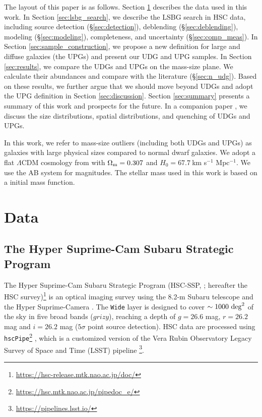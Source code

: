 \documentclass[twocolumn,astrosymb,twocolappendix,linenumbers]{aastex631}
\newcommand{\code}[1]{\texttt{#1}}
\begin{document}
\begin{CJK*}{UTF8}{gbsn}
The layout of this paper is as follows. Section \ref{sec:data} describes the data used in this work. In Section \ref{sec:lsbg_search}, we describe the LSBG search in HSC data, including source detection (\S \ref{sec:detection}), deblending (\S \ref{sec:deblending}), modeling (\S \ref{sec:modeling}), completeness, and uncertainty (\S\ref{sec:comp_meas}). In Section \ref{sec:sample_construction}, we propose a new definition for large and diffuse galaxies (the UPGs) and present our UDG and UPG samples. In Section \ref{sec:results}, we compare the UDGs and UPGs on the mass-size plane. We calculate their abundances and compare with the literature (\S \ref{sec:n_udg}). Based on these results, we further argue that we should move beyond UDGs and adopt the UPG definition in Section \ref{sec:discussion}. Section \ref{sec:summary} presents a summary of this work and prospects for the future. In a companion paper \citep{Li2023}, we discuss the size distributions, spatial distributions, and quenching of UDGs and UPGs. 

In this work, we refer to mass-size outliers (including both UDGs and UPGs) as galaxies with large physical sizes compared to normal dwarf galaxies. We adopt a flat $\Lambda$CDM cosmology from \citet{Planck15} with $\Omega_{\rm m}= 0.307$ and $H_0 = 67.7\ $km s$^{-1}$ Mpc$^{-1}$. We use the AB system \citep{Oke1983} for magnitudes. The stellar mass used in this work is based on a \citet{Chabrier2003} initial mass function.


\section{Data} \label{sec:data}
\subsection{The Hyper Suprime-Cam Subaru Strategic Program}
The Hyper Suprime-Cam Subaru Strategic Program (HSC-SSP, \citealt{Aihara2018}; hereafter the HSC survey)\footnote{\url{https://hsc-release.mtk.nao.ac.jp/doc/}} is an optical imaging survey using the 8.2-m Subaru telescope and the Hyper Suprime-Camera \citep{Miyazaki2012, Miyazaki2018}. The \texttt{Wide} layer is designed to cover $\sim 1000\ \rm{deg}^{2}$ of the sky in five broad bands ($grizy$), reaching a depth of $g=26.6$ mag, $r=26.2$ mag and $i=26.2$ mag ($5\sigma$ point source detection). HSC data are processed using  \code{hscPipe}\footnote{\url{https://hsc.mtk.nao.ac.jp/pipedoc_e/}} \citep{Bosch2018}, which is a customized version of the Vera Rubin Observatory Legacy Survey of Space and Time (LSST) pipeline \citep{LSST-pipeline}\footnote{\url{https://pipelines.lsst.io/}}.


\end{CJK*}
\end{document}
